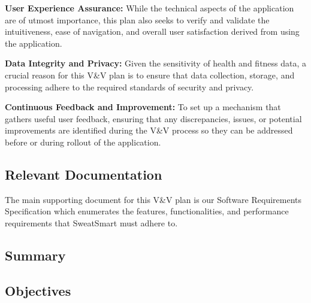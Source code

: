 \documentclass[12pt, titlepage]{article}
\begin{document}
\textbf{User Experience Assurance: }While the technical aspects of the application are of utmost importance, this plan also seeks to verify and validate the intuitiveness, ease of navigation, and overall user satisfaction derived from using the application. \newline

\textbf{Data Integrity and Privacy: }Given the sensitivity of health and fitness data, a crucial reason for this V\&V plan is to ensure that data collection, storage, and processing adhere to the required standards of security and privacy. \newline

\textbf{Continuous Feedback and Improvement: }To set up a mechanism that gathers useful user feedback, ensuring that any discrepancies, issues, or potential improvements are identified during the V\&V process so they can be addressed before or during rollout of the application. \newline

\subsection{Relevant Documentation}

The main supporting document for this V\&V plan is our Software Requirements Specification which enumerates the features, functionalities, and performance requirements that SweatSmart must adhere to. 

\subsection{Summary}


\subsection{Objectives}


\end{document}
